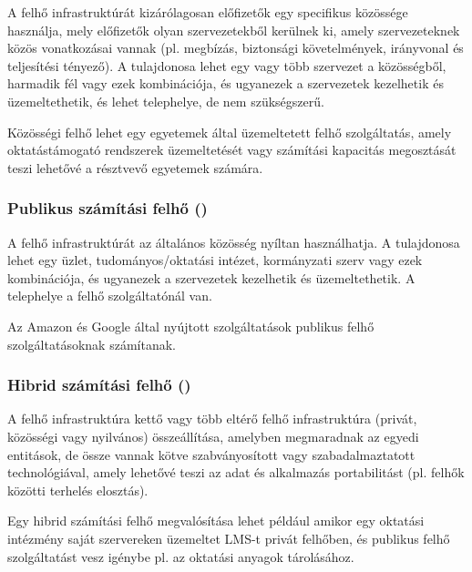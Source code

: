 A felhő infrastruktúrát kizárólagosan előfizetők egy specifikus közössége használja, mely előfizetők olyan szervezetekből kerülnek ki, amely szervezeteknek közös vonatkozásai vannak (pl. megbízás, biztonsági követelmények, irányvonal és teljesítési tényező). A tulajdonosa lehet egy vagy több szervezet a közösségből, harmadik fél vagy ezek kombinációja, és ugyanezek a szervezetek kezelhetik és üzemeltethetik, és lehet telephelye, de nem szükségszerű.

Közösségi felhő lehet egy egyetemek által üzemeltetett felhő szolgáltatás, amely oktatástámogató rendszerek üzemeltetését vagy számítási kapacitás megosztását teszi lehetővé a résztvevő egyetemek számára. 

\subsubsection{Publikus számítási felhő ()}

A felhő infrastruktúrát az általános közösség nyíltan használhatja. A tulajdonosa lehet egy üzlet, tudományos/oktatási intézet, kormányzati szerv vagy ezek kombinációja, és ugyanezek a szervezetek kezelhetik és üzemeltethetik. A telephelye a felhő szolgáltatónál van.

Az Amazon és Google által nyújtott szolgáltatások publikus felhő szolgáltatásoknak számítanak.

\subsubsection{Hibrid számítási felhő ()}

A felhő infrastruktúra kettő vagy több eltérő felhő infrastruktúra (privát, közösségi vagy nyilvános) összeállítása, amelyben megmaradnak az egyedi entitások, de össze vannak kötve szabványosított vagy szabadalmaztatott technológiával, amely lehetővé teszi az adat és alkalmazás portabilitást (pl. felhők közötti terhelés elosztás).

Egy hibrid számítási felhő megvalósítása lehet például amikor egy oktatási intézmény saját szervereken üzemeltet LMS-t privát felhőben, és publikus felhő szolgáltatást vesz igénybe pl. az oktatási anyagok tárolásához.
